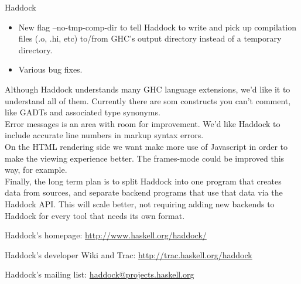 \begin{hcarentry}{Haddock}
\begin{itemize}
\item New flag --no-tmp-comp-dir to tell Haddock to write and pick up
      compilation files (.o, .hi, etc) to/from GHC's output directory instead
      of a temporary directory.

\item Various bug fixes.

\end{itemize}

\FuturePlans
Although Haddock understands many GHC language extensions, we'd like it to
understand all of them. Currently there are som constructs you can't comment,
like GADTs and associated type synonyms.
\\ 
Error messages is an area with room for improvement. We'd like Haddock
to include accurate line numbers in markup syntax errors.
\\
On the HTML rendering side we want make more use of Javascript in order to make
the viewing experience better. The frames-mode could be improved this way, for
example.
\\
Finally, the long term plan is to split Haddock into one program that creates
data from sources, and separate backend programs that use that data via the
Haddock API. This will scale better, not requiring adding new backends to Haddock
for every tool that needs its own format.
\FurtherReading
\begin{compactitem}
\item Haddock's homepage:
\url{http://www.haskell.org/haddock/}

\item Haddock's developer Wiki and Trac:
\url{http://trac.haskell.org/haddock}

\item Haddock's mailing list:
\url{haddock@projects.haskell.org}
\end{compactitem}
\end{hcarentry}
